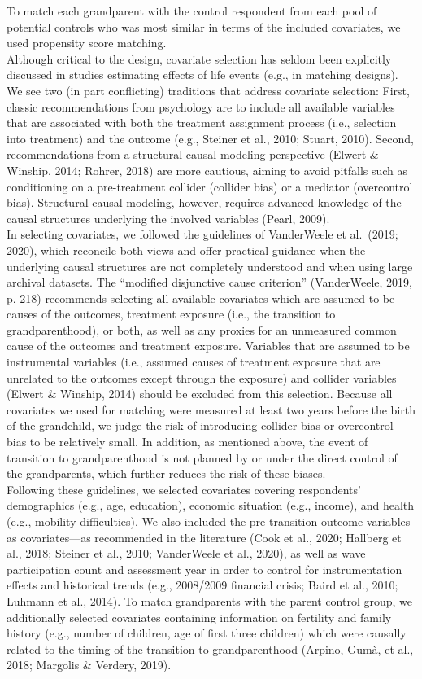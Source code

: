\documentclass[
  english,
  man, noextraspace,floatsintext]{apa7}
\begin{document}
To match each grandparent with the control respondent from each pool of potential controls who was most similar in terms of the included covariates, we used propensity score matching.\\
Although critical to the design, covariate selection has seldom been explicitly discussed in studies estimating effects of life events (e.g., in matching designs). We see two (in part conflicting) traditions that address covariate selection: First, classic recommendations from psychology are to include all available variables that are associated with both the treatment assignment process (i.e., selection into treatment) and the outcome (e.g., Steiner et al., 2010; Stuart, 2010). Second, recommendations from a structural causal modeling perspective (Elwert \& Winship, 2014; Rohrer, 2018) are more cautious, aiming to avoid pitfalls such as conditioning on a pre-treatment collider (collider bias) or a mediator (overcontrol bias). Structural causal modeling, however, requires advanced knowledge of the causal structures underlying the involved variables (Pearl, 2009).\\
In selecting covariates, we followed the guidelines of VanderWeele et al.~(2019; 2020), which reconcile both views and offer practical guidance when the underlying causal structures are not completely understood and when using large archival datasets. The \enquote{modified disjunctive cause criterion} (VanderWeele, 2019, p. 218) recommends selecting all available covariates which are assumed to be causes of the outcomes, treatment exposure (i.e., the transition to grandparenthood), or both, as well as any proxies for an unmeasured common cause of the outcomes and treatment exposure. Variables that are assumed to be instrumental variables (i.e., assumed causes of treatment exposure that are unrelated to the outcomes except through the exposure) and collider variables (Elwert \& Winship, 2014) should be excluded from this selection. Because all covariates we used for matching were measured at least two years before the birth of the grandchild, we judge the risk of introducing collider bias or overcontrol bias to be relatively small. In addition, as mentioned above, the event of transition to grandparenthood is not planned by or under the direct control of the grandparents, which further reduces the risk of these biases.\\
Following these guidelines, we selected covariates covering respondents' demographics (e.g., age, education), economic situation (e.g., income), and health (e.g., mobility difficulties). We also included the pre-transition outcome variables as covariates---as recommended in the literature (Cook et al., 2020; Hallberg et al., 2018; Steiner et al., 2010; VanderWeele et al., 2020), as well as wave participation count and assessment year in order to control for instrumentation effects and historical trends (e.g., 2008/2009 financial crisis; Baird et al., 2010; Luhmann et al., 2014). To match grandparents with the parent control group, we additionally selected covariates containing information on fertility and family history (e.g., number of children, age of first three children) which were causally related to the timing of the transition to grandparenthood (Arpino, Gumà, et al., 2018; Margolis \& Verdery, 2019).\\
\end{document}
